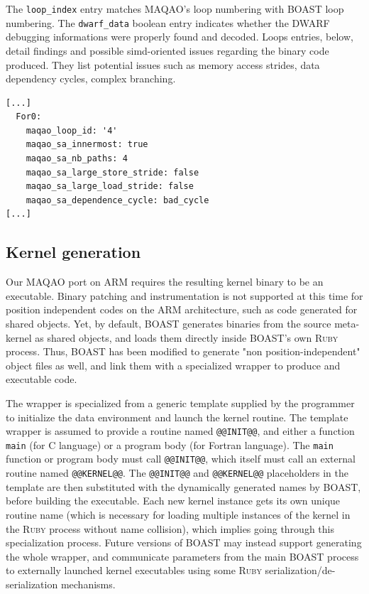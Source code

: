 \documentclass[11pt, a4paper, twoside]{montblanc2}
\def\ruby{\textsc{Ruby}\xspace}
\begin{document}
The \verb|loop_index| entry matches MAQAO's loop numbering with BOAST loop
numbering. The \verb|dwarf_data| boolean entry indicates whether the DWARF
debugging informations were properly found and decoded. Loops entries, below, detail
findings and possible simd-oriented issues regarding the binary code produced.
They list potential issues such as memory access strides, data dependency
cycles, complex branching.

\begin{verbatim}
[...]
  For0:
    maqao_loop_id: '4'
    maqao_sa_innermost: true
    maqao_sa_nb_paths: 4
    maqao_sa_large_store_stride: false
    maqao_sa_large_load_stride: false
    maqao_sa_dependence_cycle: bad_cycle
[...]
\end{verbatim}

\subsection{Kernel generation}

Our MAQAO port on ARM requires the resulting kernel binary to be an executable.
Binary patching and instrumentation is not supported at this time for position
independent codes on the ARM architecture, such as code generated for shared
objects. Yet, by default, BOAST generates binaries from the source meta-kernel
as shared objects, and loads them directly inside BOAST's own \ruby process.
Thus, BOAST has been modified to generate "non position-independent" object
files as well, and link them with a specialized wrapper to produce and
executable code.

The wrapper is specialized from a generic template supplied by
the programmer to initialize the data environment and launch the kernel
routine. The template wrapper is assumed to provide a routine named
\verb|@@INIT@@|, and either a function \texttt{main} (for C language) or a
program body (for Fortran language). The \texttt{main} function or program body
must call \verb|@@INIT@@|, which itself must call an external routine named
\verb|@@KERNEL@@|. The \verb|@@INIT@@| and \verb|@@KERNEL@@| placeholders in the 
template are then
substituted with the dynamically generated names by BOAST, before building the
executable. Each new kernel instance gets its own unique routine name (which is 
necessary for loading multiple instances of the kernel in the \ruby process 
without name collision), which implies going through this specialization 
process. Future versions of BOAST may instead support generating the whole 
wrapper, and communicate parameters from the main BOAST process to externally 
launched kernel executables using some \ruby serialization/de-serialization 
mechanisms.
\end{document}
